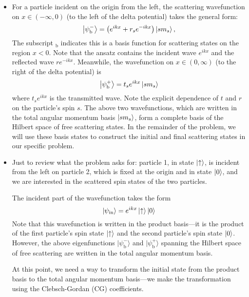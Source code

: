 \documentclass[11pt, a4paper]{article}
\newcommand{\ua}{\uparrow}  %
\newcommand{\bket}[1]{\big | {#1} \big \rangle}  %
\begin{document}
\begin{itemize}
	\item  For a particle incident on the origin from the left, the scattering wavefunction on $ x \in (-\infty, 0) $ (to the left of the delta potential) takes the general form:
	\begin{equation*}
		\bket{\psi_{\text{b}}^{-}} = \left(e^{ik x} + r_{s}e^{-ik x}\right)\ket{sm_{s}},
	\end{equation*}
	The subscript $ {}_{\text{b}} $ indicates this is a basis function for scattering states on the region $ x < 0 $. Note that the ansatz contains the incident wave $ e^{ikx} $ and the reflected wave $ re^{-ikx} $.  Meanwhile, the wavefunction on $ x \in (0, \infty)  $ (to the right of the delta potential) is
	\begin{equation*}
		\ket{\psi_{\text{b}}^{+}} = t_{s} e^{ikx}\ket{sm_{s}}
	\end{equation*}
	where $ t_{s}e^{ikx} $ is the transmitted wave. Note the explicit dependence of $ t $ and $ r $ on the particle's spin $ s $. The above two wavefunctions, which are written in the total angular momentum basis $ \ket{sm_{s}} $, form a complete basis of the Hilbert space of free scattering states. In the remainder of the problem, we will use these basis states to construct the initial and final scattering states in our specific problem. 
	

			
	\item Just to review what the problem asks for: particle 1, in state $ \ket{\ua} $, is incident from the left on particle 2, which is fixed at the origin and in state $ \ket{0} $, and we are interested in the scattered spin states of the two particles.
	
	The incident part of the wavefunction takes the form
	\begin{equation*}
		\ket{\psi_{\text{in}}} = e^{ikx} \ket{\ua} \ket{0}
	\end{equation*}
	Note that this wavefunction is written in the product basis---it is the product of the first particle's spin state $ \ket{\ua} $ and the second particle's spin state $ \ket{0} $. However, the above eigenfunctions $ \bket{\psi_{\text{b}}^{-}} $ and $ \bket{\psi_{\text{b}}^{+}} $ spanning the Hilbert space of free scattering are written in the total angular momentum basis.
	
	At this point, we need a way to transform the initial state from the product basis to the total angular momentum basis---we make the transformation using the Clebsch-Gordan (CG) coefficients.
\end{itemize}	
\end{document}
